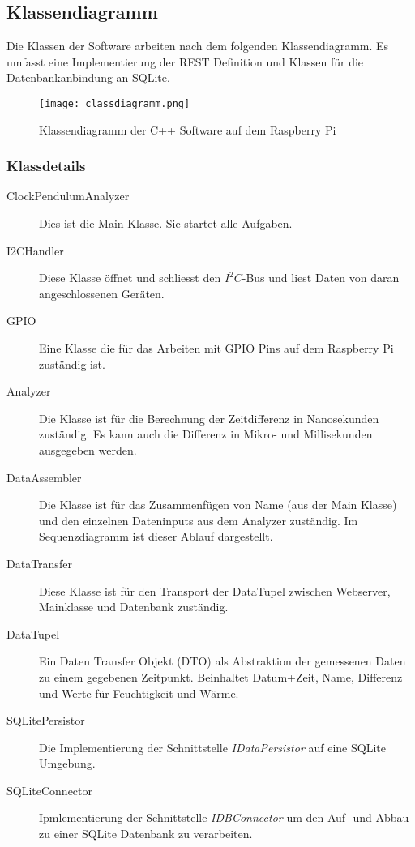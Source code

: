 \subsection{Klassendiagramm}
Die Klassen der Software arbeiten nach dem folgenden Klassendiagramm. Es umfasst eine Implementierung der REST Definition und Klassen für die Datenbankanbindung an SQLite.
\begin{figure}[H]
    \centering
    \texttt{[image: classdiagramm.png]}
    \caption{Klassendiagramm der C++ Software auf dem Raspberry Pi}
\end{figure}
\subsubsection{Klassdetails}
	\begin{description}
        \item[ClockPendulumAnalyzer] Dies ist die Main Klasse. Sie startet alle Aufgaben.
        \item[I2CHandler] Diese Klasse öffnet und schliesst den $I^2C$-Bus und liest Daten von daran angeschlossenen Geräten.
        \item[GPIO] Eine Klasse die für das Arbeiten mit GPIO Pins auf dem Raspberry Pi zuständig ist.
        \item[Analyzer] Die Klasse ist für die Berechnung der Zeitdifferenz in Nanosekunden zuständig. Es kann auch die Differenz in Mikro- und Millisekunden ausgegeben werden.
        \item[DataAssembler] Die Klasse ist für das Zusammenfügen von Name (aus der Main Klasse) und den einzelnen Dateninputs aus dem Analyzer zuständig. Im Sequenzdiagramm ist dieser Ablauf dargestellt. %
        \item[DataTransfer] Diese Klasse ist für den Transport der DataTupel zwischen Webserver, Mainklasse und Datenbank zuständig.
        \item[DataTupel] Ein Daten Transfer Objekt (DTO) als Abstraktion der gemessenen Daten zu einem gegebenen Zeitpunkt. Beinhaltet Datum+Zeit, Name, Differenz und Werte für Feuchtigkeit und Wärme.
        \item[SQLitePersistor] Die Implementierung der Schnittstelle \textit{IDataPersistor} auf eine SQLite Umgebung.
        \item[SQLiteConnector] Ipmlementierung der Schnittstelle \textit{IDBConnector} um den Auf- und Abbau zu einer SQLite Datenbank zu verarbeiten.
    \end{description}